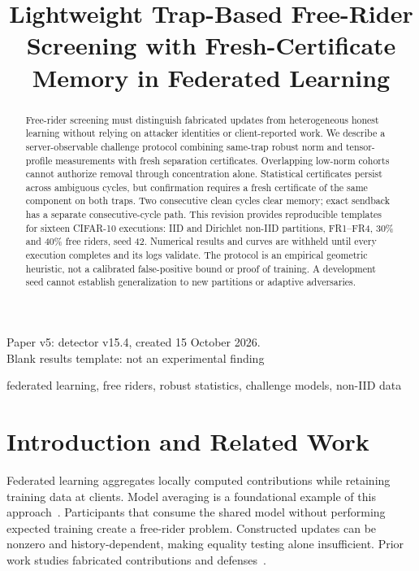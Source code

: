 \documentclass[conference]{IEEEtran}
\title{Lightweight Trap-Based Free-Rider Screening with Fresh-Certificate Memory in Federated Learning}
\author{\IEEEauthorblockN{Aashnan Rahman}
\IEEEauthorblockA{Department of Computer Science and Engineering\\
Islamic University of Technology\\MSc Thesis}}
\begin{document}
\maketitle
\begin{center}\small
Paper v5: detector v15.4, created 15 October 2026.\\
\ifpaperresults\else Blank results template: not an experimental finding\fi
\end{center}

\begin{abstract}
Free-rider screening must distinguish fabricated updates from heterogeneous
honest learning without relying on attacker identities or client-reported work.
We describe a server-observable challenge protocol combining same-trap robust
norm and tensor-profile measurements with fresh separation certificates.
Overlapping low-norm cohorts cannot authorize removal through concentration
alone. Statistical certificates persist across ambiguous cycles, but confirmation
requires a fresh certificate of the same component on both traps. Two consecutive
clean cycles clear memory; exact sendback has a separate consecutive-cycle path.
This revision provides reproducible templates for sixteen CIFAR-10 executions:
IID and Dirichlet non-IID partitions, FR1--FR4, 30\% and 40\% free riders, seed 42.
Numerical results and curves are withheld until every execution completes and
its logs validate. The protocol is an empirical geometric heuristic, not a
calibrated false-positive bound or proof of training. A development seed cannot
establish generalization to new partitions or adaptive adversaries.
\end{abstract}
\begin{IEEEkeywords}
federated learning, free riders, robust statistics, challenge models, non-IID data
\end{IEEEkeywords}

\section{Introduction and Related Work}
Federated learning aggregates locally computed contributions while retaining
training data at clients. Model averaging is a foundational example of this
approach~\cite{mcmahan2017communication}. Participants that consume the shared
model without performing expected training create a free-rider problem.
Constructed updates can be nonzero and history-dependent, making equality
testing alone insufficient. Prior work studies fabricated contributions and
defenses~\cite{lin2019freeriders,fraboni2021freerider}.
\end{document}
